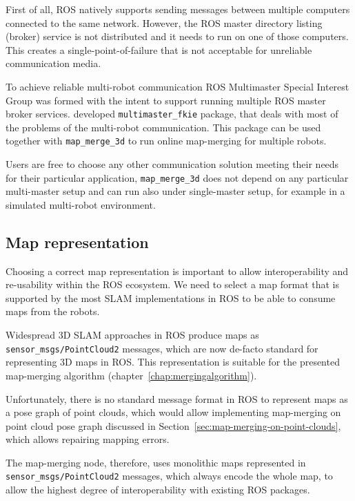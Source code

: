 First of all, \gls{ROS} natively supports sending messages between multiple computers connected to the same network. However, the \gls{ROS} master directory listing (broker) service is not distributed and it needs to run on one of those computers. This creates a single-point-of-failure that is not acceptable for unreliable communication media.

To achieve reliable multi-robot communication \gls{ROS} Multimaster Special Interest Group was formed with the intent to support running multiple \gls{ROS} master broker services. \citet{hernadez2015multi} developed \texttt{multimaster\_fkie} package, that deals with most of the problems of the multi-robot communication. This package can be used together with \texttt{map\_merge\_3d} to run online map-merging for multiple robots.

Users are free to choose any other communication solution meeting their needs for their particular application, \texttt{map\_merge\_3d} does not depend on any particular multi-master setup and can run also under single-master setup, for example in a simulated multi-robot environment.

\subsection{Map representation}
\label{sec:map-representation}

Choosing a correct map representation is important to allow interoperability and re-usability within the \gls{ROS} ecosystem. We need to select a map format that is supported by the most \gls{SLAM} implementations in \gls{ROS} to be able to consume maps from the robots.

Widespread \gls{3D} \gls{SLAM} approaches in \gls{ROS} produce maps as \texttt{sen\-sor\_msgs/\-Point\-Cloud2} messages, which are now de-facto standard for representing \gls{3D} maps in \gls{ROS}. This representation is suitable for the presented map-merging algorithm (chapter~\ref{chap:mergingalgorithm}).

Unfortunately, there is no standard message format in \gls{ROS} to represent maps as a pose graph of point clouds, which would allow implementing map-merging on point cloud pose graph discussed in Section~\ref{sec:map-merging-on-point-clouds}, which allows repairing mapping errors.

The map-merging node, therefore, uses monolithic maps represented in \texttt{sen\-sor\_msgs/\-Point\-Cloud2} messages, which always encode the whole map, to allow the highest degree of interoperability with existing \gls{ROS} packages.

